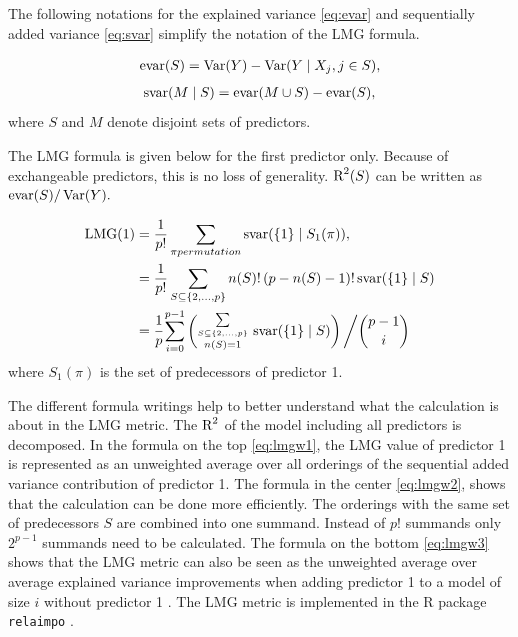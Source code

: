 \documentclass[11pt,a4paper,twoside]{book}\usepackage[]{graphicx}\usepackage[]{color}
\begin{document}
The following notations for the explained variance \eqref{eq:evar} and sequentially added variance \eqref{eq:svar} simplify the notation of the LMG formula. 

   \begin{align} 
     \text{evar}(S) = \operatorname{Var}(Y) - \operatorname{Var}( Y \mid X_{j}, j \in S),   \label{eq:evar} 
   \end{align} 
   \begin{align} 
     \text{svar}(M \mid S) = \text{evar}(M \cup S) - \text{evar}(S), \label{eq:svar} 
    \end{align} where $S$ and $M$ denote disjoint sets of predictors.
    
   The LMG formula is given below for the first predictor only. Because of exchangeable predictors, this is no loss of generality.  $\text{R}^2(S)$ can be written as $\text{evar}(S)/\operatorname{Var}(Y).$ 

   \begin{align} 
     \text{LMG}(1) &= \frac{1}{p!} \sum_{\pi permutation}^{} \text{svar}(\{1\} \mid S_{1}(\pi)),   \label{eq:lmgw1}  \\
     &= \frac{1}{p!} \sum_{S \subseteq \{ 2, \dots, p \} }^{} n(S)! \, (p-n(S)-1)! \, \text{svar}(\{1\} \mid S) \label{eq:lmgw2}  \\
     &=  \cfrac{1}{p} \sum_{i=0}^{p-1} \left( \substack {\sum\limits_{ S \subseteq \{ 2, \dots, p \}}\\n(S)=1}^{} \ \text{svar}(\{1\} \mid S)\right)\bigg/ \binom{p-1}{i}  \label{eq:lmgw3}
   \end{align}
   where $S_{1}(\pi)$ is the set of predecessors of predictor 1.
   
   The different formula writings help to better understand what the calculation is about in the LMG metric. The $\text{R}^2$ of the model including all predictors is decomposed. In the formula on the top \eqref{eq:lmgw1}, the LMG value of predictor 1 is represented as an unweighted average over all orderings of the sequential added variance contribution of predictor 1. The formula in the center \eqref{eq:lmgw2}, shows that the calculation can be  done more efficiently. The orderings with the same set of predecessors $S$ are combined into one summand. Instead of $p!$ summands only $2^{p-1}$ summands need to be calculated. The formula on the bottom \eqref{eq:lmgw3} shows that the LMG metric can also be seen as the unweighted average over average explained variance improvements when adding predictor 1 to a model of size $i$ without predictor 1 \citep{Gromping2015}. The LMG metric is implemented in the R package \texttt{relaimpo} \citep{Gromping2006}.
   
\end{document}
